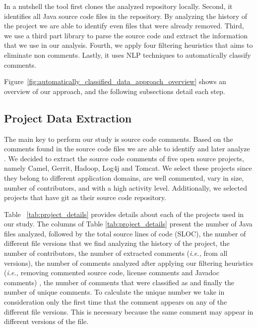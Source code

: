 In a nutshell the tool first clones the analyzed repository locally. Second, it identifies all Java source code files in the repository. By analyzing the history of the project we are able to identify even files that were already removed. Third, we use a third part library to parse the source code and extract the information that we use in our analysis. Fourth, we apply four filtering heuristics that aims to eliminate non \SATD comments. Lastly, it uses NLP techniques to automatically classify \SATD comments. 

Figure~\ref{fig:automatically_classified_data_approach_overview} shows an overview of our approach, and the following subsections detail each step.

\subsection{Project Data Extraction}
\label{sub:project_data_extraction}

The main key to perform our study is source code comments. Based on the comments found in the source code files we are able to identify and later analyze \SATD. We decided to extract the source code comments of five open source projects, namely Camel, Gerrit, Hadoop, Log4j and Tomcat. We select these projects since they belong to different application domains, are well commented, vary in size, number of contributors, and with a high activity level. Additionally, we selected projects that have git as their source code repository.





Table ~\ref{tab:project_details} provides details about each of the projects used in our study. The columns of Table \ref{tab:project_details} present the number of Java files analyzed, followed by the total source lines of code (SLOC), the number of different file versions that we find analyzing the history of the project, the number of contributors, the number of extracted comments (\textit{i.e.,} from all versions), the number of comments analyzed after applying our filtering heuristics (\textit{i.e.,} removing commented source code, license comments and Javadoc comments) , the number of comments that were classified as \SATD and finally the number of unique \SATD comments. To calculate the unique \SATD number we take in consideration only the first time that the comment appears on any of the different file versions. This is necessary because the same comment may appear in different versions of the file. 


